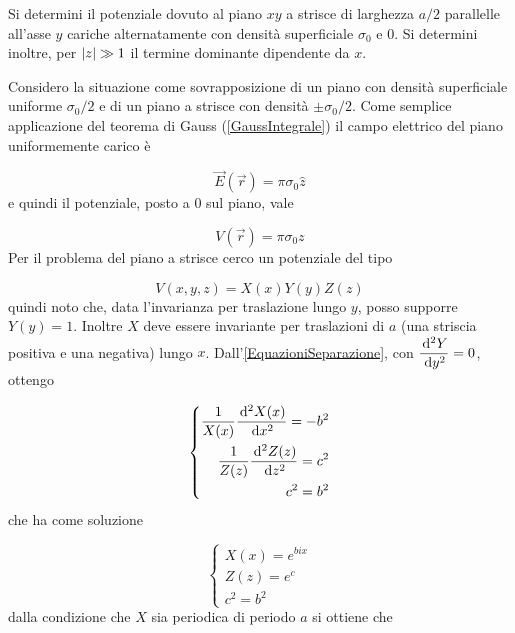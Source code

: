 \documentclass[../main.tex]{subfiles}
\begin{document}

\textex

Si determini il potenziale dovuto al piano $xy$ a strisce di larghezza $a/2$ parallelle all'asse $y$ cariche alternatamente con densità superficiale $\sigma_0$  e $0$.\newline
Si determini inoltre, per $\lvert z\rvert \gg 1$ il termine dominante dipendente da $x$.

\solution
Considero la situazione come sovrapposizione di un piano con densità superficiale uniforme $\sigma_0/2$ e di un piano a strisce con densità $\pm \sigma_0/2$.
Come semplice applicazione del teorema di Gauss (\cref{GaussIntegrale}) il campo elettrico del piano uniformemente carico è

\begin{equation*}
  \vec E (\vec r)= \pi \sigma_0 \hat z 
\end{equation*}
e quindi il potenziale, posto a $0$ sul piano, vale

\begin{equation}
  \label{pz:potenzialeuniforme}
  V(\vec r)= \pi \sigma_0 z
\end{equation}
Per il problema del piano a strisce cerco un potenziale del tipo

\begin{equation*}
  V(x, y, z)=X(x)Y(y)Z(z)
\end{equation*}
quindi noto che, data l'invarianza per traslazione lungo $y$, posso supporre $Y(y)=1$.
Inoltre $X$ deve essere invariante per traslazioni di $a$ (una striscia positiva e una negativa) lungo $x$.
Dall'\cref{EquazioniSeparazione}, con $\displaystyle\frac{\,\mathrm d^2Y}{\,\mathrm d y^2}=0$, ottengo

\begin{equation}
  \left\{
    \begin{aligned}
      \frac{1}{X(x)}\frac{\,\mathrm d^2X(x)}{\,\mathrm d x^2}=-b^2\\
      \frac{1}{Z(z)}\frac{\,\mathrm d^2Z(z)}{\,\mathrm d z^2}=c^2\\
      c^2=b^2
    \end{aligned}
  \right.
\end{equation}
che ha come soluzione 

\begin{equation}
  \left\{
    \begin{aligned}
      X(x)=e^{bix} \\
      Z(z)=e^c \\
      c^2=b^2 
    \end{aligned}
  \right.
\end{equation}
dalla condizione che $X$ sia periodica di periodo $a$ si ottiene che
\end{document}
